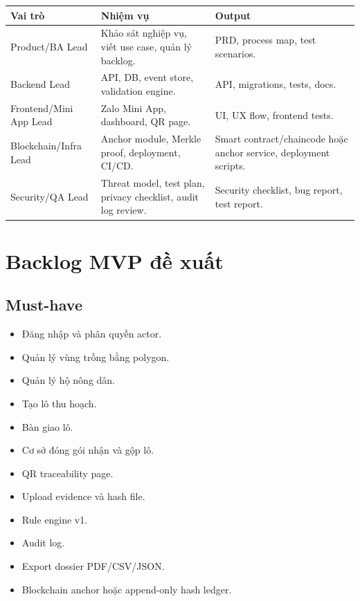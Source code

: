 \documentclass[12pt,a4paper]{article}
\begin{document}
\begin{longtable}{p{4cm}p{5cm}p{4.5cm}}
\toprule
\textbf{Vai trò} & \textbf{Nhiệm vụ} & \textbf{Output} \\
\midrule
\endhead
Product/BA Lead & Khảo sát nghiệp vụ, viết use case, quản lý backlog. & PRD, process map, test scenarios. \\
\addlinespace
Backend Lead & API, DB, event store, validation engine. & API, migrations, tests, docs. \\
\addlinespace
Frontend/Mini App Lead & Zalo Mini App, dashboard, QR page. & UI, UX flow, frontend tests. \\
\addlinespace
Blockchain/Infra Lead & Anchor module, Merkle proof, deployment, CI/CD. & Smart contract/chaincode hoặc anchor service, deployment scripts. \\
\addlinespace
Security/QA Lead & Threat model, test plan, privacy checklist, audit log review. & Security checklist, bug report, test report. \\
\bottomrule
\end{longtable}

\section{Backlog MVP đề xuất}

\subsection{Must-have}

\begin{itemize}[leftmargin=2em]
    \item Đăng nhập và phân quyền actor.
    \item Quản lý vùng trồng bằng polygon.
    \item Quản lý hộ nông dân.
    \item Tạo lô thu hoạch.
    \item Bàn giao lô.
    \item Cơ sở đóng gói nhận và gộp lô.
    \item QR traceability page.
    \item Upload evidence và hash file.
    \item Rule engine v1.
    \item Audit log.
    \item Export dossier PDF/CSV/JSON.
    \item Blockchain anchor hoặc append-only hash ledger.
\end{itemize}
\end{document}
